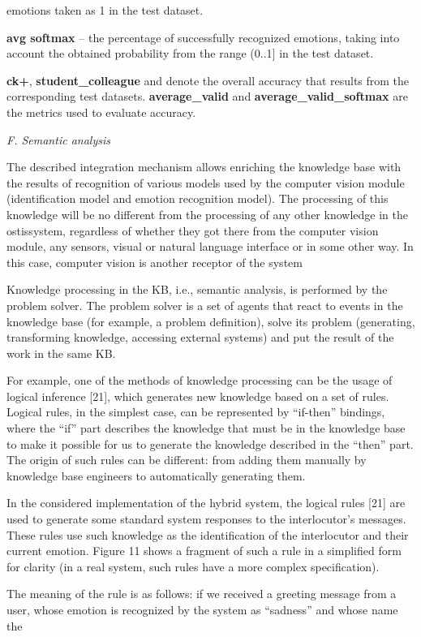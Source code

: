 \documentclass{report}
\begin{document}
\begin{multicols}{2}
\vspace{0.1cm}

\par \noindent emotions taken as 1 in the test dataset.
\par \textbf{avg softmax} – the percentage of successfully recognized emotions, taking into account the obtained probability from the range (0..1] in the test dataset.
\par \textbf{ck+}, \textbf{student\_colleague} and  denote the overall accuracy that results from the corresponding test
datasets. \textbf{average\_valid} and \textbf{average\_valid\_softmax} are
the metrics used to evaluate accuracy.
\par \noindent \textit{F. Semantic analysis}
\par The described integration mechanism allows enriching
the knowledge base with the results of recognition of
various models used by the computer vision module
(identification model and emotion recognition model).
The processing of this knowledge will be no different
from the processing of any other knowledge in the ostissystem, regardless of whether they got there from the
computer vision module, any sensors, visual or natural
language interface or in some other way. In this case,
computer vision is another receptor of the system
\par Knowledge processing in the KB, i.e., semantic analysis, is performed by the problem solver. The problem
solver is a set of agents that react to events in the
knowledge base (for example, a problem definition),
solve its problem (generating, transforming knowledge,
accessing external systems) and put the result of the work
in the same KB.
\par For example, one of the methods of knowledge processing can be the usage of logical inference [21],
which generates new knowledge based on a set of rules.
Logical rules, in the simplest case, can be represented
by “if-then” bindings, where the “if” part describes the
knowledge that must be in the knowledge base to make
it possible for us to generate the knowledge described in
the “then” part. The origin of such rules can be different:
from adding them manually by knowledge base engineers
to automatically generating them.
\par In the considered implementation of the hybrid system,
the logical rules [21] are used to generate some standard
system responses to the interlocutor’s messages. These
rules use such knowledge as the identification of the
interlocutor and their current emotion. Figure 11 shows
a fragment of such a rule in a simplified form for
clarity (in a real system, such rules have a more complex
specification).
\par The meaning of the rule is as follows: if we received
a greeting message from a user, whose emotion is recognized by the system as “sadness” and whose name the

\end{multicols}
\end{document}
